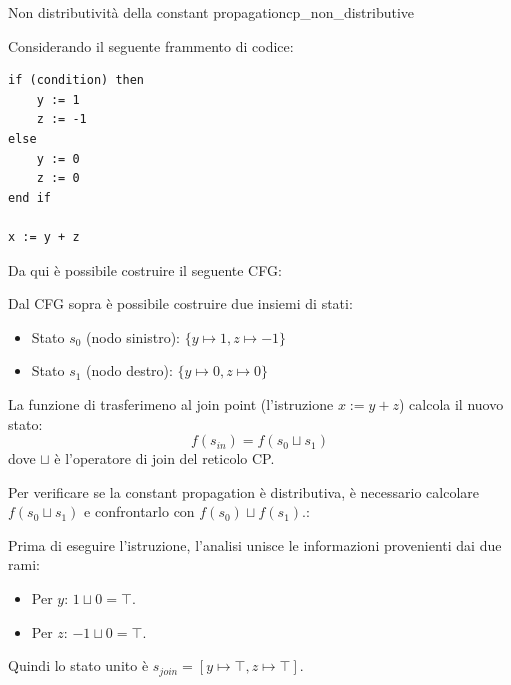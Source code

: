 \begin{nota}{Non distributività della constant propagation}{cp_non_distributive}

    Considerando il seguente frammento di codice:

\begin{verbatim}
if (condition) then
    y := 1
    z := -1
else
    y := 0
    z := 0
end if

x := y + z
\end{verbatim}

Da qui è possibile costruire il seguente CFG:

\begin{center}
\end{center}

Dal CFG sopra è possibile costruire due insiemi di stati:
\begin{itemize}
    \item Stato $s_0$ (nodo sinistro): $ \{ y \mapsto 1, z \mapsto -1 \} $
    \item Stato $s_1$ (nodo destro): $ \{ y \mapsto 0, z \mapsto 0 \} $
\end{itemize}

La funzione di trasferimeno al join point (l'istruzione $x := y + z$) calcola il
nuovo stato:
\[
f(s_{in}) = f(s_0 \sqcup s_1)
\]
dove $\sqcup$ è l'operatore di join del reticolo CP.

Per verificare se la constant propagation è distributiva, è necessario calcolare
$f(s_0 \sqcup s_1)$ e confrontarlo con $f(s_0) \sqcup f(s_1)$.:
 

Prima di eseguire l'istruzione, l'analisi unisce le informazioni provenienti
dai due rami:
\begin{itemize}
    \item Per $y$: $1 \sqcup 0 = \top$.
    \item Per $z$: $-1 \sqcup 0 = \top$.
\end{itemize}
Quindi lo stato unito è $s_{join} = [ y \mapsto \top, z \mapsto \top ]$.



\end{nota}
